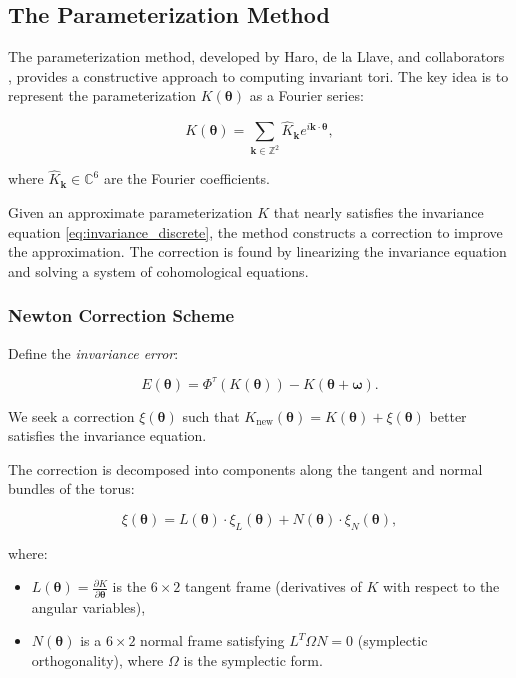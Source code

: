 \documentclass[review,onefignum,onetabnum]{siamart220329}
\newcommand{\CC}{\mathbb{C}}
\begin{document}
\subsection{The Parameterization Method}

The parameterization method, developed by Haro, de la Llave, and collaborators
\cite{haro2006parameterization,haro2016parameterization}, provides a constructive
approach to computing invariant tori. The key idea is to represent the parameterization
$K(\boldsymbol{\theta})$ as a Fourier series:

\begin{equation}
K(\boldsymbol{\theta}) = \sum_{\mathbf{k} \in \mathbb{Z}^2} \hat{K}_{\mathbf{k}}
e^{i\mathbf{k} \cdot \boldsymbol{\theta}},
\end{equation}

where $\hat{K}_{\mathbf{k}} \in \CC^6$ are the Fourier coefficients.

Given an approximate parameterization $K$ that nearly satisfies the invariance
equation \eqref{eq:invariance_discrete}, the method constructs a correction to
improve the approximation. The correction is found by linearizing the invariance
equation and solving a system of cohomological equations.

\subsubsection{Newton Correction Scheme}

Define the \emph{invariance error}:

\begin{equation}
E(\boldsymbol{\theta}) = \Phi^\tau(K(\boldsymbol{\theta})) -
K(\boldsymbol{\theta} + \boldsymbol{\omega}).
\end{equation}

We seek a correction $\xi(\boldsymbol{\theta})$ such that
$K_{\text{new}}(\boldsymbol{\theta}) = K(\boldsymbol{\theta}) + \xi(\boldsymbol{\theta})$
better satisfies the invariance equation.

The correction is decomposed into components along the tangent and normal bundles
of the torus:

\begin{equation}
\xi(\boldsymbol{\theta}) = L(\boldsymbol{\theta}) \cdot \xi_L(\boldsymbol{\theta})
+ N(\boldsymbol{\theta}) \cdot \xi_N(\boldsymbol{\theta}),
\end{equation}

where:
\begin{itemize}
    \item $L(\boldsymbol{\theta}) = \frac{\partial K}{\partial \boldsymbol{\theta}}$
          is the $6 \times 2$ tangent frame (derivatives of $K$ with respect to
          the angular variables),
    \item $N(\boldsymbol{\theta})$ is a $6 \times 2$ normal frame satisfying
          $L^T \Omega N = 0$ (symplectic orthogonality), where $\Omega$ is the
          symplectic form.
\end{itemize}
\end{document}
